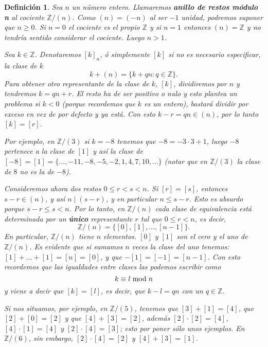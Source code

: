 \documentclass[12pt]{article}
\newtheorem{definition}[theorem]{Definición}
\begin{document}
\begin{definition} Sea $n$ un número entero. Llamaremos \textbf{anillo de restos módulo n} al cociente $\mathbb{Z}/(n)$. Como $(n) = (-n)$ al ser $-1$ unidad, podremos suponer que $n \geq 0$. Si $n = 0$ el cociente es el propio $\mathbb{Z}$ y si $n=1$ entonces $(n) = \mathbb{Z}$  y no tendría sentido considerar el cociente. Luego $n >1$.

Sea $k \in \mathbb{Z}$. Denotaremos $[k]_{n}$, ó simplemente $[k]$ si no es necesario especificar, la clase de $k$ $$k + (n) = \lbrace k + qn: q \in \mathbb{Z}\rbrace.$$ 
Para obtener otro representante de la clase de $k$, $[k]$, dividiremos por $n$ y tendremos $k = qn + r$. El resto ha de ser positivo o nulo y esto plantea un problema si $k <0$ (porque recordemos que $k$ es un entero), bastará dividir por exceso en vez de por defecto y ya está. Con esto $k -r = qn \in (n)$, por lo tanto $[k] = [r]$. 

Por ejemplo, en $\mathbb{Z}/(3)$ si $k = -8$ tenemos que $-8 = -3 \cdot 3 + 1$, luego $-8$ pertenece a la clase de $[1]$ y así la clase de $[-8] = [1] = \lbrace \ldots, -11, -8, -5, -2, 1, 4, 7, 10, \ldots \rbrace$ (notar que en $\mathbb{Z}/(3)$ la clase de $8$ no es la de $-8$). 

Consideremos ahora dos restos $0 \leq r < s < n$. Si $[r] = [s]$, entonces $s-r \in (n)$, y así $n \mid (s-r)$, y en particular $n  \leq s-r$. Esto es absurdo porque $s-r \leq s < n$. Por lo tanto, en $\mathbb{Z}/(n)$ cada clase de equivalencia está determinada por un \textbf{único} representante $r$ tal que $0 \leq r <n$, es decir, $$\mathbb{Z}/(n) = \lbrace [0], [1], \ldots, [n-1] \rbrace.$$
En particular, $\mathbb{Z}/(n)$ tiene $n$ elementos. $[0]$ y $[1]$ son el cero y el uno de $\mathbb{Z}/(n)$. Es evidente que si sumamos $n$ veces la clase del uno tenemos: $[1] + \ldots +[1] = [n] = [0]$, y que $-[1] = [-1] = [n-1]$. Con esto recordemos que las igualdades entre clases las podemos escribir como $$k \equiv l \hspace{0.1cm}\text{mod}\hspace{0.1cm} n$$ y viene a decir que $[k] = [l]$, es decir, que $k-l = qn$ con un $q \in \mathbb{Z}$. 

Si nos situamos, por ejemplo, en $\mathbb{Z}/(5)$, tenemos que $[3] + [1] = [4]$, que $[2] + [0] = [2]$ y que $[4]+ [3] = [2]$, además $[2] \cdot [2] = [4]$, $[4] \cdot [1] = [4]$ y $[2] \cdot [4] = [3]$; esto por poner sólo unos ejemplos. En $\mathbb{Z}/(6)$, sin embargo, $[2] \cdot [4] = [2]$ y $[4] + [3] = [1]$.
\end{definition}
\end{document}
